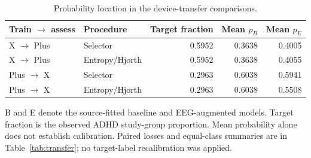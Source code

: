 \begin{table}[!htbp]
\centering\small
\caption{Probability location in the device-transfer comparisons.}
\label{tab:transfer-probability-location}
\begin{tabular}{llrrr}
\toprule
Train $\to$ assess & Procedure & Target fraction & Mean $p_B$ & Mean $p_E$\\
\midrule
X $\to$ Plus & Selector & 0.5952 & 0.3638 & 0.4005\\
X $\to$ Plus & Entropy/Hjorth & 0.5952 & 0.3638 & 0.4055\\
Plus $\to$ X & Selector & 0.2963 & 0.6038 & 0.5941\\
Plus $\to$ X & Entropy/Hjorth & 0.2963 & 0.6038 & 0.5508\\
\bottomrule
\end{tabular}
\par\smallskip\begin{minipage}{\textwidth}\footnotesize B and E denote the source-fitted baseline and EEG-augmented models. Target fraction is the observed ADHD study-group proportion. Mean probability alone does not establish calibration. Paired losses and equal-class summaries are in Table~\ref{tab:transfer}; no target-label recalibration was applied.
\end{minipage}
\end{table}
